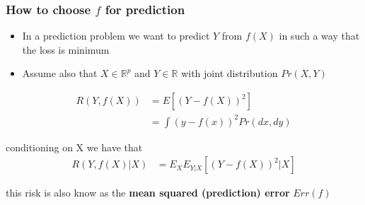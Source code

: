 \documentclass[
  shownotes,
  xcolor={svgnames},
  hyperref={colorlinks,citecolor=DarkBlue,linkcolor=DarkRed,urlcolor=DarkBlue}
  ]{beamer}
\begin{document}

\begin{frame}
\frametitle{How to choose $f$ for prediction}
\begin{itemize}
  \item In a prediction problem we want to predict $Y$ from $f(X)$ in such a way that the loss is minimum
  \item Assume also that $X \in \mathbb{R}^p$ and $Y \in \mathbb{R}$ with joint distribution $Pr(X,Y)$
\end{itemize}

\begin{align}
  R(Y,f(X)) &=E[(Y-f(X))^2] \\
            &=\int (y-f(x))^2 Pr(dx,dy)
\end{align}

conditioning on X we have that
\begin{align}
 R(Y,f(X)|X) &= E_X E_{Y|X} [(Y-f(X))^2|X]
\end{align}

this risk is also know as the {\bf mean squared (prediction) error} $Err(f)$
\end{frame}
\end{document}
